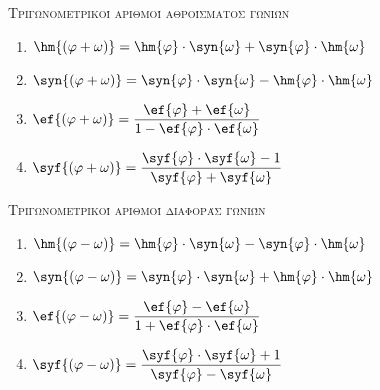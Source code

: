 \begin{center}
{\large \scfont\scshape{\textcolor{\xrwma}{Τριγωνομετρικοί αριθμοί αθροίσματος γωνιών}}}
\end{center}
\begin{multicols}{2}
\begin{enumerate}[itemsep=0mm]
\item $ \hm{\left( \varphi+\omega\right) }=\hm{\varphi}\cdot\syn{\omega}+\syn{\varphi}\cdot\hm{\omega} $
\item $ \syn {\left( \varphi+\omega\right) }=\syn{\varphi}\cdot\syn{\omega}-\hm{\varphi}\cdot\hm{\omega} $
\item $ \ef{\left( \varphi+\omega\right) }=\dfrac{\ef{\varphi}+\ef{\omega}}{1-\ef{\varphi}\cdot\ef{\omega}} $
\item $ \syf{\left( \varphi+\omega\right) }=\dfrac{\syf{\varphi}\cdot\syf{\omega}-1}{\syf{\varphi}+\syf{\omega}} $
\end{enumerate}
\end{multicols}
\begin{center}
{\large \scfont\scshape{\textcolor{\xrwma}{Τριγωνομετρικοί αριθμοί διαφοράς γωνιών}}}
\end{center}
\begin{multicols}{2}
\begin{enumerate}[itemsep=0mm]
\item $ \hm{\left( \varphi-\omega\right) }=\hm{\varphi}\cdot\syn{\omega}-\syn{\varphi}\cdot\hm{\omega} $
\item $ \syn{\left( \varphi-\omega\right) }=\syn{\varphi}\cdot\syn{\omega}+\hm{\varphi}\cdot\hm{\omega} $
\item $ \ef{\left( \varphi-\omega\right) }=\dfrac{\ef{\varphi}-\ef{\omega}}{1+\ef{\varphi}\cdot\ef{\omega}} $
\item $ \syf{\left( \varphi-\omega\right) }=\dfrac{\syf{\varphi}\cdot\syf{\omega}+1}{\syf{\varphi}-\syf{\omega}} $
\end{enumerate}
\end{multicols}
